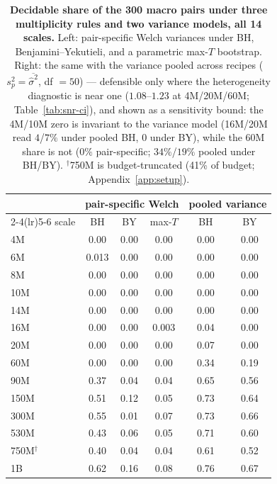 \begin{table}[!htbp]
\centering
\caption{\textbf{Decidable share of the 300 macro pairs under three multiplicity rules and
two variance models, all 14 scales.} Left: pair-specific Welch variances under BH,
Benjamini--Yekutieli, and a parametric max-$T$ bootstrap. Right: the same with the variance
pooled across recipes ($s_p^2 = \overline{\hat\sigma^2}$, df $= 50$) --- defensible only
where the heterogeneity diagnostic is near one ($1.08$--$1.23$ at 4M/20M/60M;
Table~\ref{tab:snr-ci}), and shown as a sensitivity bound: the 4M/10M zero is invariant to
the variance model (16M/20M read $4$/$7\%$ under pooled BH, $0$ under BY), while the 60M share is
not ($0\%$ pair-specific; $34\%$/$19\%$ pooled
under BH/BY). $^\dagger$750M is budget-truncated (41\% of budget; Appendix~\ref{app:setup}).}
\label{tab:decidable}
\footnotesize
\begin{tabular}{@{}lccccc@{}}
\toprule
& \multicolumn{3}{c}{pair-specific Welch} & \multicolumn{2}{c}{pooled variance} \\
\cmidrule(lr){2-4}\cmidrule(lr){5-6}
scale & BH & BY & max-$T$ & BH & BY \\
\midrule
4M & 0.00 & 0.00 & 0.00 & 0.00 & 0.00 \\
6M & 0.013 & 0.00 & 0.00 & 0.00 & 0.00 \\
8M & 0.00 & 0.00 & 0.00 & 0.00 & 0.00 \\
10M & 0.00 & 0.00 & 0.00 & 0.00 & 0.00 \\
14M & 0.00 & 0.00 & 0.00 & 0.00 & 0.00 \\
16M & 0.00 & 0.00 & 0.003 & 0.04 & 0.00 \\
20M & 0.00 & 0.00 & 0.00 & 0.07 & 0.00 \\
60M & 0.00 & 0.00 & 0.00 & 0.34 & 0.19 \\
90M & 0.37 & 0.04 & 0.04 & 0.65 & 0.56 \\
150M & 0.51 & 0.12 & 0.05 & 0.73 & 0.64 \\
300M & 0.55 & 0.01 & 0.07 & 0.73 & 0.66 \\
530M & 0.43 & 0.06 & 0.05 & 0.71 & 0.60 \\
750M$^\dagger$ & 0.40 & 0.04 & 0.04 & 0.61 & 0.52 \\
1B & 0.62 & 0.16 & 0.08 & 0.76 & 0.67 \\
\bottomrule
\end{tabular}
\end{table}

